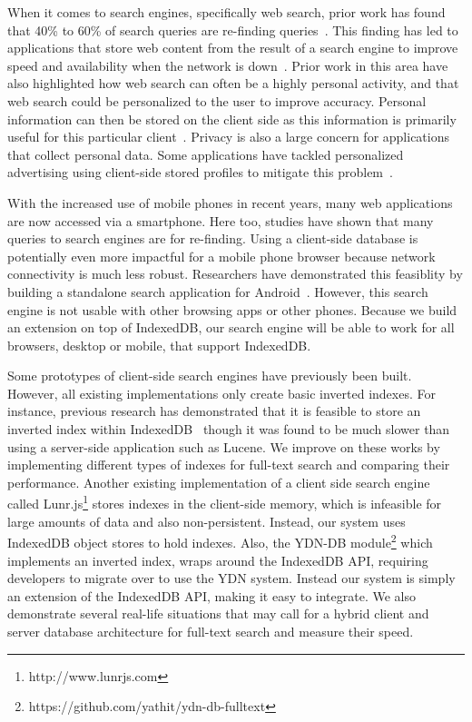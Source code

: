 \documentclass{vldb}
\begin{document}
When it comes to search engines, specifically web search, prior work has found that 40\% to 60\% of search queries are re-finding queries~\cite{teevan2005personalizing}. This finding has led to applications that store web content from the result of a search engine to improve speed and availability when the network is down~\cite{bozzon2010liquid,bharat2000searchpad,balasubramanian2012findall}. Prior work in this area have also highlighted how web search can often be a highly personal activity, and that web search could be personalized to the user to improve accuracy. Personal information can then be stored on the client side as this information is primarily useful for this particular client~\cite{teevan2005personalizing}.
Privacy is also a large concern for applications that collect personal data. Some applications have tackled personalized advertising using client-side stored profiles to mitigate this problem~\cite{bilenko2011predictive}.

With the increased use of mobile phones in recent years, many web applications are now accessed via a smartphone. Here too, studies have shown that many queries to search engines are for re-finding. Using a client-side database is potentially even more impactful for a mobile phone browser because network connectivity is much less robust. Researchers have demonstrated this feasiblity by building a standalone search application for Android~\cite{balasubramanian2012findall}. However, this search engine is not usable with other browsing apps or other phones. Because we build an extension on top of IndexedDB, our search engine will be able to work for all browsers, desktop or mobile, that support IndexedDB.

Some prototypes of client-side search engines have previously been built. However, all existing implementations only create basic inverted indexes.
For instance, previous research has demonstrated that it is feasible to store an inverted index within IndexedDB~\cite{lin:jscene} though it was found to be much slower than using a server-side application such as Lucene.
We improve on these works by implementing different types of indexes for full-text search and comparing their performance. 
Another existing implementation of a client side search engine called Lunr.js\footnote{http://www.lunrjs.com} stores indexes in the client-side memory, which is infeasible for large amounts of data and also non-persistent. Instead, our system uses IndexedDB object stores to hold indexes. Also, the YDN-DB module\footnote{https://github.com/yathit/ydn-db-fulltext} which implements an inverted index, wraps around the IndexedDB API, requiring developers to migrate over to use the YDN system. Instead our system is simply an extension of the IndexedDB API, making it easy to integrate.
We also demonstrate several real-life situations that may call for a hybrid client and server database architecture for full-text search and measure their speed.
\end{document}
